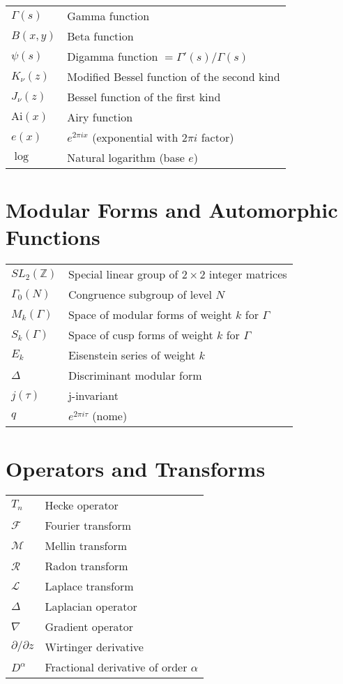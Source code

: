 \begin{tabular}{ll}
$\Gamma(s)$ & Gamma function \\
$B(x,y)$ & Beta function \\
$\psi(s)$ & Digamma function $= \Gamma'(s)/\Gamma(s)$ \\
$K_{\nu}(z)$ & Modified Bessel function of the second kind \\
$J_{\nu}(z)$ & Bessel function of the first kind \\
$\text{Ai}(x)$ & Airy function \\
$e(x)$ & $e^{2\pi i x}$ (exponential with $2\pi i$ factor) \\
$\log$ & Natural logarithm (base $e$) \\
\end{tabular}

\section{Modular Forms and Automorphic Functions}

\begin{tabular}{ll}
$SL_2(\mathbb{Z})$ & Special linear group of $2 \times 2$ integer matrices \\
$\Gamma_0(N)$ & Congruence subgroup of level $N$ \\
$M_k(\Gamma)$ & Space of modular forms of weight $k$ for $\Gamma$ \\
$S_k(\Gamma)$ & Space of cusp forms of weight $k$ for $\Gamma$ \\
$E_k$ & Eisenstein series of weight $k$ \\
$\Delta$ & Discriminant modular form \\
$j(\tau)$ & j-invariant \\
$q$ & $e^{2\pi i \tau}$ (nome) \\
\end{tabular}

\section{Operators and Transforms}

\begin{tabular}{ll}
$T_n$ & Hecke operator \\
$\mathcal{F}$ & Fourier transform \\
$\mathcal{M}$ & Mellin transform \\
$\mathcal{R}$ & Radon transform \\
$\mathcal{L}$ & Laplace transform \\
$\Delta$ & Laplacian operator \\
$\nabla$ & Gradient operator \\
$\partial/\partial z$ & Wirtinger derivative \\
$D^{\alpha}$ & Fractional derivative of order $\alpha$ \\
\end{tabular}

